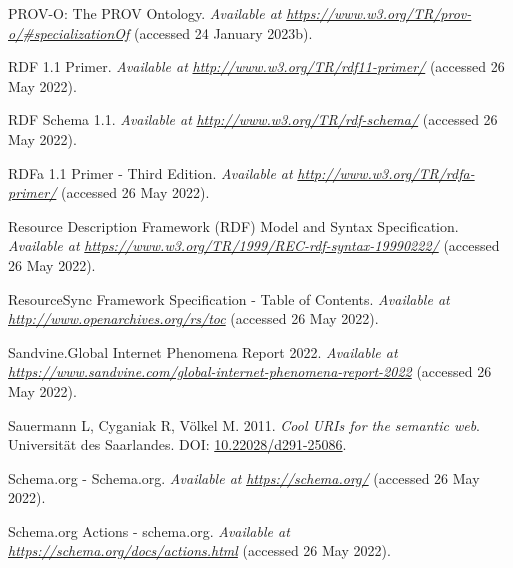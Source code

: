 \begin{CSLReferences}{1}{0}
\leavevmode{}%
PROV-O: The PROV Ontology. \emph{Available at} \href{https://www.w3.org/TR/prov-o/\#specializationOf}{\emph{https://www.w3.org/TR/prov-o/\#specializationOf}} (accessed 24 January 2023b).

\leavevmode{}%
RDF 1.1 Primer. \emph{Available at} \href{http://www.w3.org/TR/rdf11-primer/}{\emph{http://www.w3.org/TR/rdf11-primer/}} (accessed 26 May 2022).

\leavevmode{}%
RDF Schema 1.1. \emph{Available at} \href{http://www.w3.org/TR/rdf-schema/}{\emph{http://www.w3.org/TR/rdf-schema/}} (accessed 26 May 2022).

\leavevmode{}%
RDFa 1.1 Primer - Third Edition. \emph{Available at} \href{http://www.w3.org/TR/rdfa-primer/}{\emph{http://www.w3.org/TR/rdfa-primer/}} (accessed 26 May 2022).

\leavevmode{}%
Resource Description Framework (RDF) Model and Syntax Specification. \emph{Available at} \href{https://www.w3.org/TR/1999/REC-rdf-syntax-19990222/}{\emph{https://www.w3.org/TR/1999/REC-rdf-syntax-19990222/}} (accessed 26 May 2022).

\leavevmode{}%
ResourceSync Framework Specification - Table of Contents. \emph{Available at} \href{http://www.openarchives.org/rs/toc}{\emph{http://www.openarchives.org/rs/toc}} (accessed 26 May 2022).

\leavevmode{}%
Sandvine.Global Internet Phenomena Report 2022. \emph{Available at} \href{https://www.sandvine.com/global-internet-phenomena-report-2022}{\emph{https://www.sandvine.com/global-internet-phenomena-report-2022}} (accessed 26 May 2022).

\leavevmode{}%
Sauermann L, Cyganiak R, Völkel M. 2011. \emph{Cool URIs for the semantic web}. Universität des Saarlandes. DOI: \href{https://doi.org/10.22028/d291-25086}{10.22028/d291-25086}.

\leavevmode{}%
Schema.org - Schema.org. \emph{Available at} \href{https://schema.org/}{\emph{https://schema.org/}} (accessed 26 May 2022).

\leavevmode{}%
Schema.org Actions - schema.org. \emph{Available at} \href{https://schema.org/docs/actions.html}{\emph{https://schema.org/docs/actions.html}} (accessed 26 May 2022).


\end{CSLReferences}

